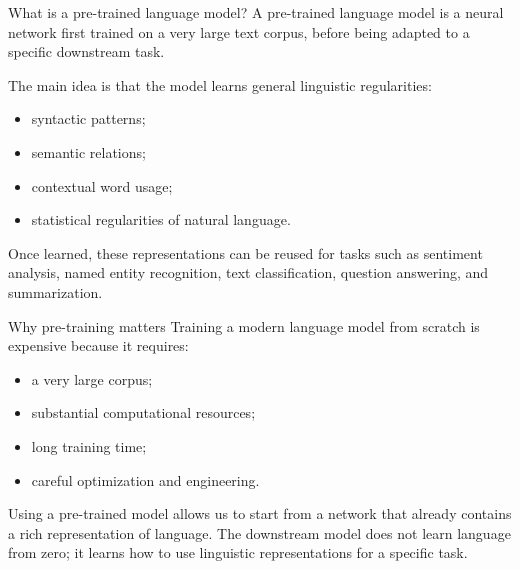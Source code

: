 \documentclass[aspectratio=169]{beamer}
\begin{document}
\begin{frame}{What is a pre-trained language model?}
A pre-trained language model is a neural network first trained on a very large text corpus, before being adapted to a specific downstream task.

\vspace{0.3cm}

The main idea is that the model learns general linguistic regularities:
\begin{itemize}
    \item syntactic patterns;
    \item semantic relations;
    \item contextual word usage;
    \item statistical regularities of natural language.
\end{itemize}

\vspace{0.2cm}

Once learned, these representations can be reused for tasks such as sentiment analysis, named entity recognition, text classification, question answering, and summarization.
\end{frame}

\begin{frame}{Why pre-training matters}
Training a modern language model from scratch is expensive because it requires:
\begin{itemize}
    \item a very large corpus;
    \item substantial computational resources;
    \item long training time;
    \item careful optimization and engineering.
\end{itemize}

\vspace{0.3cm}

Using a pre-trained model allows us to start from a network that already contains a rich representation of language. The downstream model does not learn language from zero; it learns how to use linguistic representations for a specific task.
\end{frame}
\end{document}
